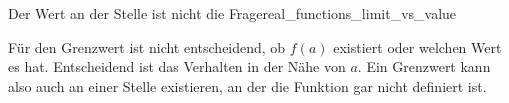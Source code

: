 \begin{KeyPointBox}{Der Wert an der Stelle ist nicht die Frage}{real_functions_limit_vs_value}
  \begin{center}
  \end{center}
  Für den Grenzwert ist nicht entscheidend, ob $f(a)$ existiert oder
  welchen Wert es hat. Entscheidend ist das Verhalten in der Nähe von $a$.
  Ein Grenzwert kann also auch an einer Stelle existieren, an der die
  Funktion gar nicht definiert ist.
\end{KeyPointBox}
